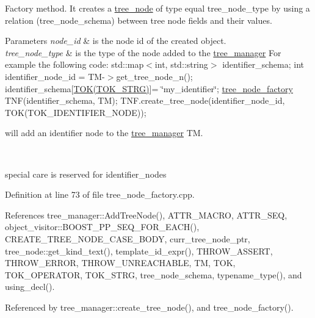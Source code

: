 Factory method. It creates a \hyperlink{classtree__node}{tree\+\_\+node} of type equal tree\+\_\+node\+\_\+type by using a relation (tree\+\_\+node\+\_\+schema) between tree node fields and their values. 
\begin{DoxyParams}{Parameters}
{\em node\+\_\+id} & is the node id of the created object. \\
\hline
{\em tree\+\_\+node\+\_\+type} & is the type of the node added to the \hyperlink{classtree__manager}{tree\+\_\+manager} For example the following code\+: std\+::map$<$int, std\+::string$>$ identifier\+\_\+schema; int identifier\+\_\+node\+\_\+id = T\+M-\/$>$get\+\_\+tree\+\_\+node\+\_\+n(); identifier\+\_\+schema\mbox{[}\hyperlink{token__interface_8hpp_af180edc73e28ca632a9a702e51523f19}{T\+O\+K(\+T\+O\+K\+\_\+\+S\+T\+R\+G)}\mbox{]}= \char`\"{}my\+\_\+identifier\char`\"{}; \hyperlink{structtree__node__factory}{tree\+\_\+node\+\_\+factory} T\+N\+F(identifier\+\_\+schema, T\+M); T\+N\+F.\+create\+\_\+tree\+\_\+node(identifier\+\_\+node\+\_\+id, T\+O\+K(\+T\+O\+K\+\_\+\+I\+D\+E\+N\+T\+I\+F\+I\+E\+R\+\_\+\+N\+O\+D\+E));
\begin{DoxyItemize}
\item will add an identifier node to the \hyperlink{classtree__manager}{tree\+\_\+manager} TM. 
\end{DoxyItemize}\\
\hline
\end{DoxyParams}
special care is reserved for identifier\+\_\+nodes 

Definition at line 73 of file tree\+\_\+node\+\_\+factory.\+cpp.



References tree\+\_\+manager\+::\+Add\+Tree\+Node(), A\+T\+T\+R\+\_\+\+M\+A\+C\+RO, A\+T\+T\+R\+\_\+\+S\+EQ, object\+\_\+visitor\+::\+B\+O\+O\+S\+T\+\_\+\+P\+P\+\_\+\+S\+E\+Q\+\_\+\+F\+O\+R\+\_\+\+E\+A\+C\+H(), C\+R\+E\+A\+T\+E\+\_\+\+T\+R\+E\+E\+\_\+\+N\+O\+D\+E\+\_\+\+C\+A\+S\+E\+\_\+\+B\+O\+DY, curr\+\_\+tree\+\_\+node\+\_\+ptr, tree\+\_\+node\+::get\+\_\+kind\+\_\+text(), template\+\_\+id\+\_\+expr(), T\+H\+R\+O\+W\+\_\+\+A\+S\+S\+E\+RT, T\+H\+R\+O\+W\+\_\+\+E\+R\+R\+OR, T\+H\+R\+O\+W\+\_\+\+U\+N\+R\+E\+A\+C\+H\+A\+B\+LE, TM, T\+OK, T\+O\+K\+\_\+\+O\+P\+E\+R\+A\+T\+OR, T\+O\+K\+\_\+\+S\+T\+RG, tree\+\_\+node\+\_\+schema, typename\+\_\+type(), and using\+\_\+decl().



Referenced by tree\+\_\+manager\+::create\+\_\+tree\+\_\+node(), and tree\+\_\+node\+\_\+factory().

